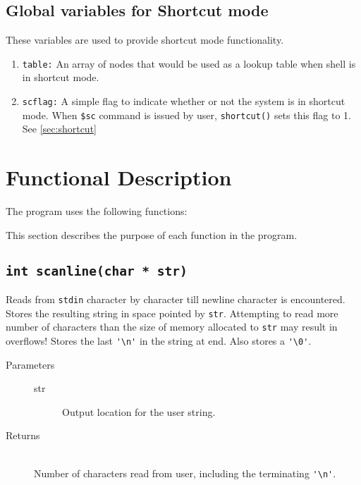 \documentclass{article}
\begin{document}
\subsection{Global variables for Shortcut mode} \label{sec:shortcutgvs}

These variables are used to provide shortcut mode functionality.
\begin{enumerate}
	\item \lstinline{table:} An array of nodes that would be used as a lookup table when shell is in shortcut mode.
	\item \lstinline{scflag:} A simple flag to indicate whether or not the system is in shortcut mode. When \lstinline{$sc} command is issued by user, \lstinline{shortcut()} sets this flag to 1. See \ref{sec:shortcut}
\end{enumerate} 



\newpage
\section{Functional Description}
The program uses the following functions:


This section describes the purpose of each function in the program.

\subsection{\lstinline{int scanline(char * str)}}
Reads from \lstinline{stdin} character by character till newline character is encountered. Stores the resulting string in space pointed by \lstinline{str}. Attempting to read more number of characters than the size of memory allocated to \lstinline{str} may result in overflows! Stores the last \lstinline{'\n'} in the string at end. Also stores a \lstinline{'\0'}.
\begin{description}
	\item[Parameters]\hfill
	\begin{description}
		\item[str] Output location for the user string.
	\end{description}
	\item[Returns]\hfill\\
		Number of characters read from user, including the terminating \lstinline{'\n'}. 
\end{description}
\end{document}
